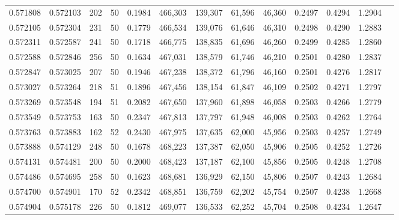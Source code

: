 \begin{tabular}{rrrrrrrrrrrrr}
0.571808 & 0.572103 &   202 &  50 &                                     0.1984 & 466,303 & 139,307 &  61,596 &  46,360 & 0.2497 & 0.4294 & 1.2904 \\
0.572105 & 0.572304 &   231 &  50 &                                     0.1779 & 466,534 & 139,076 &  61,646 &  46,310 & 0.2498 & 0.4290 & 1.2883 \\
0.572311 & 0.572587 &   241 &  50 &                                     0.1718 & 466,775 & 138,835 &  61,696 &  46,260 & 0.2499 & 0.4285 & 1.2860 \\
0.572588 & 0.572846 &   256 &  50 &                                     0.1634 & 467,031 & 138,579 &  61,746 &  46,210 & 0.2501 & 0.4280 & 1.2837 \\
0.572847 & 0.573025 &   207 &  50 &                                     0.1946 & 467,238 & 138,372 &  61,796 &  46,160 & 0.2501 & 0.4276 & 1.2817 \\
0.573027 & 0.573264 &   218 &  51 &                                     0.1896 & 467,456 & 138,154 &  61,847 &  46,109 & 0.2502 & 0.4271 & 1.2797 \\
0.573269 & 0.573548 &   194 &  51 &                                     0.2082 & 467,650 & 137,960 &  61,898 &  46,058 & 0.2503 & 0.4266 & 1.2779 \\
0.573549 & 0.573753 &   163 &  50 &                                     0.2347 & 467,813 & 137,797 &  61,948 &  46,008 & 0.2503 & 0.4262 & 1.2764 \\
0.573763 & 0.573883 &   162 &  52 &                                     0.2430 & 467,975 & 137,635 &  62,000 &  45,956 & 0.2503 & 0.4257 & 1.2749 \\
0.573888 & 0.574129 &   248 &  50 &                                     0.1678 & 468,223 & 137,387 &  62,050 &  45,906 & 0.2505 & 0.4252 & 1.2726 \\
0.574131 & 0.574481 &   200 &  50 &                                     0.2000 & 468,423 & 137,187 &  62,100 &  45,856 & 0.2505 & 0.4248 & 1.2708 \\
0.574486 & 0.574695 &   258 &  50 &                                     0.1623 & 468,681 & 136,929 &  62,150 &  45,806 & 0.2507 & 0.4243 & 1.2684 \\
0.574700 & 0.574901 &   170 &  52 &                                     0.2342 & 468,851 & 136,759 &  62,202 &  45,754 & 0.2507 & 0.4238 & 1.2668 \\
0.574904 & 0.575178 &   226 &  50 &                                     0.1812 & 469,077 & 136,533 &  62,252 &  45,704 & 0.2508 & 0.4234 & 1.2647 \\

\end{tabular}
